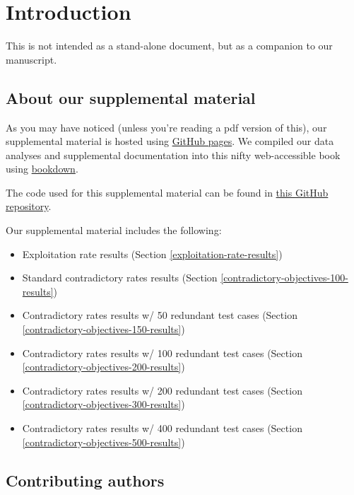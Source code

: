 \documentclass[
]{book}
\providecommand{\tightlist}{%
  \setlength{\itemsep}{0pt}\setlength{\parskip}{0pt}}
\begin{document}
\hypertarget{introduction}{%
\chapter{Introduction}\label{introduction}}

This is not intended as a stand-alone document, but as a companion to our manuscript.

\hypertarget{about-our-supplemental-material}{%
\section{About our supplemental material}\label{about-our-supplemental-material}}

As you may have noticed (unless you're reading a pdf version of this), our supplemental material is hosted using \href{https://pages.github.com/}{GitHub pages}.
We compiled our data analyses and supplemental documentation into this nifty web-accessible book using \href{https://bookdown.org}{bookdown}.

The code used for this supplemental material can be found in \href{https://github.com/jgh9094/GPTP-2024-Lexicase-Analysis}{this GitHub repository}.

Our supplemental material includes the following:

\begin{itemize}
\tightlist
\item
  Exploitation rate results (Section \ref{exploitation-rate-results})
\item
  Standard contradictory rates results (Section \ref{contradictory-objectives-100-results})
\item
  Contradictory rates results w/ 50 redundant test cases (Section \ref{contradictory-objectives-150-results})
\item
  Contradictory rates results w/ 100 redundant test cases (Section \ref{contradictory-objectives-200-results})
\item
  Contradictory rates results w/ 200 redundant test cases (Section \ref{contradictory-objectives-300-results})
\item
  Contradictory rates results w/ 400 redundant test cases (Section \ref{contradictory-objectives-500-results})
\end{itemize}

\hypertarget{contributing-authors}{%
\section{Contributing authors}\label{contributing-authors}}
\end{document}
